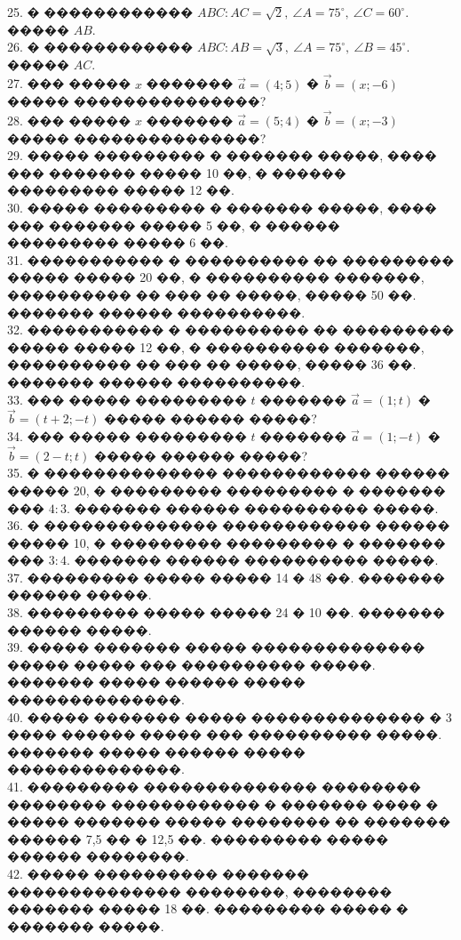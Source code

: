 \documentclass[12pt]{article}
\begin{document}
25. � ������������ $ABC: AC=\sqrt{2},\ \angle A=75^\circ,\ \angle C=60^\circ.$ ����� $AB.$\\
26. � ������������ $ABC: AB=\sqrt{3},\ \angle A=75^\circ,\ \angle B=45^\circ.$ ����� $AC.$\\
27. ��� ����� $x$ ������� $\vec{a}=(4;5)$ � $\vec{b}=(x;-6)$ ����� ���������������?\\
28. ��� ����� $x$ ������� $\vec{a}=(5;4)$ � $\vec{b}=(x;-3)$ ����� ���������������?\\
29. ����� ��������� � ������� �����, ���� ��� ������� ����� 10 ��, � ������ ��������� ����� 12 ��.\\
30. ����� ��������� � ������� �����, ���� ��� ������� ����� 5 ��, � ������ ��������� ����� 6 ��.\\
31. ����������� � ���������� �� ��������� ����� ����� 20 ��, � ���������� �������, ���������� �� ��� �� �����, ����� 50 ��. ������� ������ ����������.\\
32. ����������� � ���������� �� ��������� ����� ����� 12 ��, � ���������� �������, ���������� �� ��� �� �����, ����� 36 ��. ������� ������ ����������.\\
33. ��� ����� ��������� $t$ ������� $\vec{a}=(1;t)$ � $\vec{b}=(t+2;-t)$ ����� ������ �����?\\
34. ��� ����� ��������� $t$ ������� $\vec{a}=(1;-t)$ � $\vec{b}=(2-t;t)$ ����� ������ �����?\\
35. � �������������� ������������ ������ ����� 20, � ��������� ��������� � ������� ��� $4:3.$ ������� ������ ���������� �����.\\
36. � �������������� ������������ ������ ����� 10, � ��������� ��������� � ������� ��� $3:4.$ ������� ������ ���������� �����.\\
37. ��������� ����� ����� 14 � 48 ��. ������� ������ �����.\\
38. ��������� ����� ����� 24 � 10 ��. ������� ������ �����.\\
39. ����� ������� ����� �������������� ����� ����� ��� ���������� �����. ������� ����� ������ ����� ��������������.\\
40. ����� ������� ����� �������������� � 3 ���� ������ ����� ��� ���������� �����. ������� ����� ������ ����� ��������������.\\
41. ��������� �������������� �������� �������� ������������ � ������� ���� � ����� ������� ����� �������� �� ������� ������ 7,5 �� � 12,5 ��. ��������� ����� ������ ��������.\\
42. ����� ���������� ������� �������������� ��������, �������� ������� ����� 18 ��. ��������� ����� � ������� �����.\\
\end{document}
